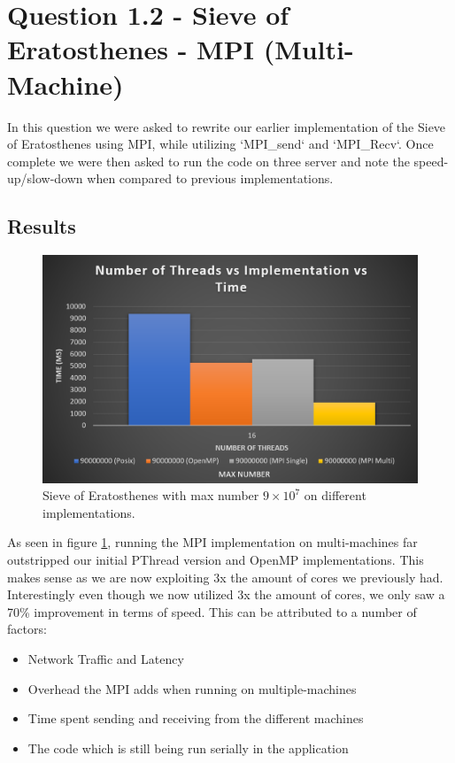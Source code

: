 \section*{Question 1.2 - Sieve of Eratosthenes - MPI (Multi-Machine)}

In this question we were asked to rewrite our earlier implementation of the 
Sieve of Eratosthenes using MPI, while utilizing `MPI\_send` and `MPI\_Recv`. 
Once complete we were then asked to run the code on three server and note the 
speed-up/slow-down when compared to previous implementations.

\subsection*{Results}

\begin{figure}
    \centering
    \includegraphics[width=\linewidth]{Figures/mpi_MULTI.png}
    \caption{Sieve of Eratosthenes with max number $9\times10^7$ on different
    implementations.}
    \label{fig:sievemulti}
\end{figure}

As seen in figure \ref{fig:sievemulti}, running the MPI implementation on multi-machines far 
outstripped our initial PThread version and OpenMP implementations.
This makes sense as we are now exploiting 3x the amount of cores we previously had.
Interestingly even though we now utilized 3x the amount of cores, we only saw a 
70\% improvement in terms of speed. This can be attributed to a number of factors:

\begin{itemize}
    \item Network Traffic and Latency
    \item Overhead the MPI adds when running on multiple-machines
    \item Time spent sending and receiving from the different machines
    \item The code which is still being run serially in the application
\end{itemize}